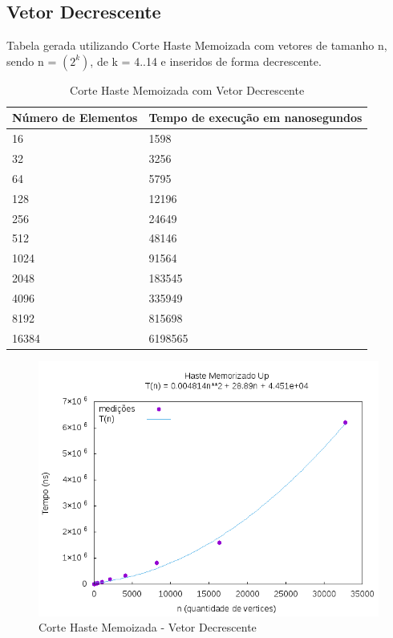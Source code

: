 \documentclass[12pt,a4paper,twoside]{report}
\begin{document}
\subsection{Vetor Decrescente}
Tabela gerada utilizando Corte Haste Memoizada com vetores de tamanho n, sendo n = $(2^k)$, de k = 4..14 e inseridos de forma decrescente.
\begin{table}[H]
\centering
\caption{Corte Haste Memoizada com Vetor Decrescente}
\label{my-label}
\begin{tabular}{|l|l|}
\hline
\multicolumn{1}{|c|}{\textbf{Número de Elementos}} & \multicolumn{1}{c|}{\textbf{Tempo de execução em nanosegundos}} \\ \hline
16 & 1598 \\ \hline
32 & 3256 \\ \hline
64 & 5795 \\ \hline
128 & 12196 \\ \hline
256 & 24649 \\ \hline
512 & 48146 \\ \hline
1024 & 91564 \\ \hline
2048 & 183545 \\ \hline
4096 & 335949 \\ \hline
8192 & 815698 \\ \hline
16384 & 6198565 \\ \hline
\end{tabular}
\end{table}

\begin{figure}[H]
    \centering
    \includegraphics[width=0.7\linewidth]{graficos/CorteHasteMemorizado/Decrescente/HasteMemo.png}
  \caption{Corte Haste Memoizada - Vetor Decrescente}
\end{figure}
\end{document}
